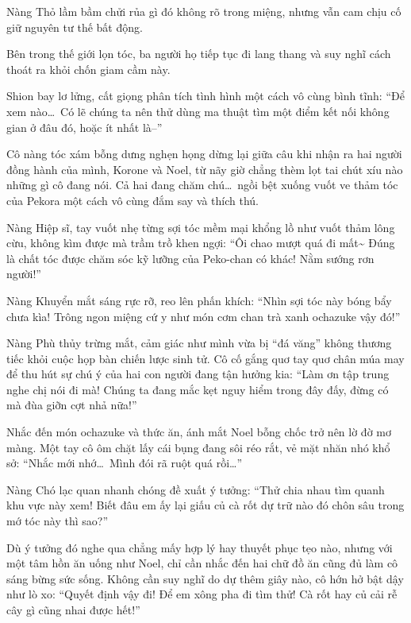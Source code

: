 \documentclass[../main.tex]{subfiles}
\begin{document}
Nàng Thỏ lầm bầm chửi rủa gì đó không rõ trong miệng, nhưng vẫn cam chịu cố giữ nguyên tư thế bất động.

\ct

Bên trong thế giới lọn tóc, ba người họ tiếp tục đi lang thang và suy nghĩ cách thoát ra khỏi chốn giam cầm này.

Shion bay lơ lửng, cất giọng phân tích tình hình một cách vô cùng bình tĩnh: ``Để xem nào\dots\ Có lẽ chúng ta nên thử dùng ma thuật tìm một điểm kết nối không gian ở đâu đó, hoặc ít nhất là--''

Cô nàng tóc xám bỗng dưng nghẹn họng dừng lại giữa câu khi nhận ra hai người đồng hành của mình, Korone và Noel, từ nãy giờ chẳng thèm lọt tai chút xíu nào những gì cô đang nói. Cả hai đang chăm chú\dots\ ngồi bệt xuống vuốt ve thảm tóc của Pekora một cách vô cùng đắm say và thích thú.


Nàng Hiệp sĩ, tay vuốt nhẹ từng sợi tóc mềm mại khổng lồ như vuốt thảm lông cừu, không kìm được mà trầm trồ khen ngợi: ``Ôi chao mượt quá đi mất\~{} Đúng là chất tóc được chăm sóc kỹ lưỡng của Peko-chan có khác! Nằm sướng rơn người!''

Nàng Khuyển mắt sáng rực rỡ, reo lên phấn khích: ``Nhìn sợi tóc này bóng bẩy chưa kìa! Trông ngon miệng cứ y như món cơm chan trà xanh ochazuke vậy đó!''

Nàng Phù thủy trừng mắt, cảm giác như mình vừa bị ``đá văng'' không thương tiếc khỏi cuộc họp bàn chiến lược sinh tử. Cô cố gắng quơ tay quơ chân múa may để thu hút sự chú ý của hai con người đang tận hưởng kia: ``Làm ơn tập trung nghe chị nói đi mà! Chúng ta đang mắc kẹt nguy hiểm trong đây đấy, đừng có mà đùa giỡn cợt nhả nữa!''

Nhắc đến món ochazuke và thức ăn, ánh mắt Noel bỗng chốc trở nên lờ đờ mơ màng. Một tay cô ôm chặt lấy cái bụng đang sôi réo rắt, vẻ mặt nhăn nhó khổ sở: ``Nhắc mới nhớ\dots\ Mình đói rã ruột quá rồi\dots''

Nàng Chó lạc quan nhanh chóng đề xuất ý tưởng: ``Thử chia nhau tìm quanh khu vực này xem! Biết đâu em ấy lại giấu củ cà rốt dự trữ nào đó chôn sâu trong mớ tóc này thì sao?''

Dù ý tưởng đó nghe qua chẳng mấy hợp lý hay thuyết phục tẹo nào, nhưng với một tâm hồn ăn uống như Noel, chỉ cần nhắc đến hai chữ đồ ăn cũng đủ làm cô sáng bừng sức sống. Không cần suy nghĩ do dự thêm giây nào, cô hớn hở bật dậy như lò xo: ``Quyết định vậy đi! Để em xông pha đi tìm thử! Cà rốt hay củ cải rễ cây gì cũng nhai được hết!''
\end{document}
